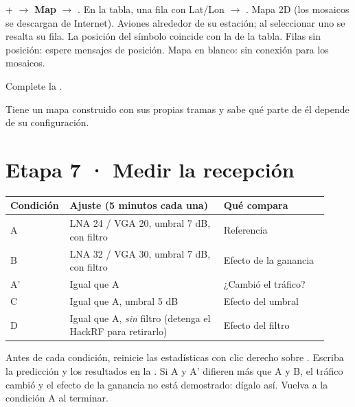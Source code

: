 {+ $\rightarrow$ \textbf{Map} $\rightarrow$ . En la tabla, una fila con Lat/Lon $\rightarrow$ .}
{Mapa 2D (los mosaicos se descargan de Internet).}
{}
{Aviones alrededor de su estación; al seleccionar uno se resalta su fila.}
{La posición del símbolo coincide con la de la tabla.}
{Filas sin posición: espere mensajes de posición. Mapa en blanco: sin conexión para los mosaicos.}

Complete la .


\begin{logro}
Tiene un mapa construido con sus propias tramas y sabe qué parte de él depende de su configuración.
\end{logro}

\section{Etapa 7 · Medir la recepción}
\label{sec:u-exp}


\begin{longtable}{@{}>{\raggedright\arraybackslash}p{0.13\linewidth}>{\raggedright\arraybackslash}p{0.47\linewidth}>{\raggedright\arraybackslash}p{0.32\linewidth}@{}}
\toprule
\textbf{Condición} & \textbf{Ajuste (5 minutos cada una)} & \textbf{Qué compara} \\
\midrule
\endhead
A & LNA 24 / VGA 20, umbral 7 dB, con filtro & Referencia \\
B & LNA 32 / VGA 30, umbral 7 dB, con filtro & Efecto de la ganancia \\
A' & Igual que A & ¿Cambió el tráfico? \\
C & Igual que A, umbral 5 dB & Efecto del umbral \\
D & Igual que A, \emph{sin} filtro (detenga el HackRF para retirarlo) & Efecto del filtro \\
\bottomrule
\end{longtable}

Antes de cada condición, reinicie las estadísticas con clic derecho sobre . Escriba la predicción y los resultados en la . Si A y A' difieren más que A y B, el tráfico cambió y el efecto de la ganancia no está demostrado: dígalo así. Vuelva a la condición A al terminar.

